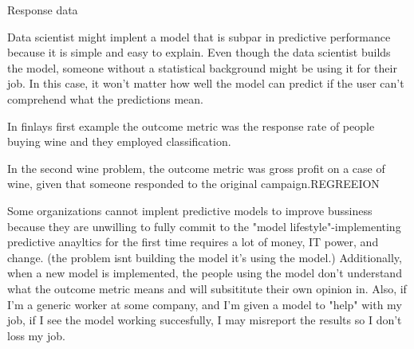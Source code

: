 \documentclass[12pt]{article}
\begin{document}


\begin{enumerate}


Response data


Data scientist might implent a model that is subpar in predictive performance because it is simple and easy to explain. Even though the data scientist builds the model, someone without a statistical background might be using it for their job. In this case, it won't matter how well the model can predict if the user can't comprehend what the predictions mean.


In finlays first example the outcome metric was the response rate of people buying wine and they employed  classification. 

In the second wine problem, the outcome metric was gross profit on a case of wine, given that someone responded to the original campaign.REGREEION


Some organizations cannot implent predictive models to improve bussiness because they are unwilling to fully commit to the "model lifestyle"-implementing predictive anayltics for the first time requires a lot of money, IT power, and change. (the problem isnt building the model it's using the model.) Additionally, when a new model is implemented, the people using the model don't understand what the outcome metric means and will subsititute their own opinion in. Also, if I'm a generic worker at some company, and I'm given a model to "help" with my job, if I see the model working succesfully,  I may misreport the results so I don't loss my job.


\end{enumerate}
\end{document}
